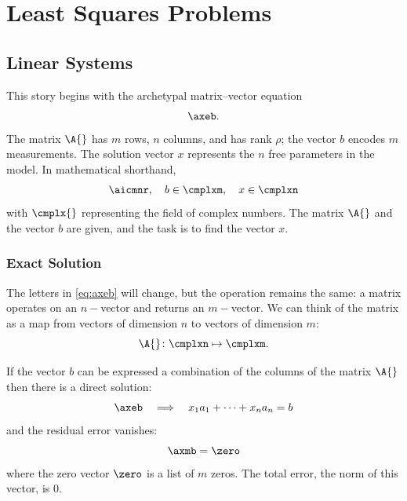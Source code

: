 \chapter{\label{ch:least squares problem}Least Squares Problems}

\section{\label{sec:linear systems}Linear Systems}  %

  This story begins with the archetypal  matrix--vector equation
  \begin{equation}   %
    \axeb .
    \label{eq:axeb}
  \end{equation}
The matrix $\A{}$ has $m$ rows, $n$ columns, and has rank $\rho$; the vector $b$ encodes $m$ measurements. The solution vector $x$ represents the $n$ free parameters in the model. In mathematical shorthand,
  \begin{equation}   %
    \aicmnr, \quad b \in \cmplxm, \quad x \in \cmplxn
  \label{eq:basics}
  \end{equation}
with $\cmplx{}$ representing the field of complex numbers. The matrix $\A{}$ and the vector $b$ are given, and the task is to find the vector $x$.

\subsection{\label{ssec:exact soln}Exact Solution}  %
The letters in \eqref{eq:axeb} will change, but the operation remains the same: a matrix operates on an $n-$vector and returns an $m-$vector. We can think of the  matrix as a map from vectors of dimension $n$ to vectors of dimension $m$:
  \begin{equation*}   %
    \A{} \colon \cmplxn \mapsto \cmplxm .
  \end{equation*}

If the vector $b$ can be expressed a combination of the columns of the matrix $\A{}$ then there is a direct solution:
\begin{equation*}
    \axeb \quad \Longrightarrow \quad x_{1} a_{1} + \cdots + x_{n} a_{n} = b
\end{equation*}
and the residual error  vanishes:
  \begin{equation*}   %
      \axmb = \zero
  \end{equation*}
where the zero vector $\zero$ is a list of $m$ zeros. The total error, the norm of this vector, is 0.

